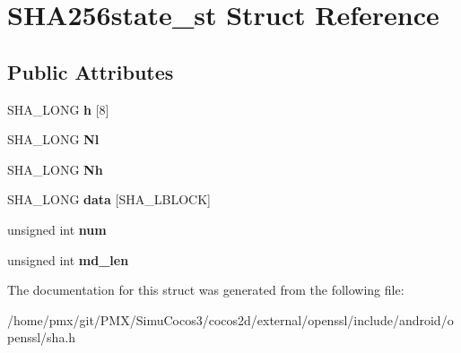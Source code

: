 \hypertarget{structSHA256state__st}{}\section{S\+H\+A256state\+\_\+st Struct Reference}
\label{structSHA256state__st}
\subsection*{Public Attributes}
\begin{DoxyCompactItemize}
\item 
\mbox{\label{structSHA256state__st_a3e23ec545b1c5f0a3cb246cfd1f24d03}} 
S\+H\+A\+\_\+\+L\+O\+NG {\bfseries h} \mbox{[}8\mbox{]}
\item 
\mbox{\label{structSHA256state__st_ac34962074aa1766470fae99d0e2aef9b}} 
S\+H\+A\+\_\+\+L\+O\+NG {\bfseries Nl}
\item 
\mbox{\label{structSHA256state__st_a02ad38687202dc1f21f78925599ec5ca}} 
S\+H\+A\+\_\+\+L\+O\+NG {\bfseries Nh}
\item 
\mbox{\label{structSHA256state__st_a23e96bd033fbbfbe1e8a016180d2215c}} 
S\+H\+A\+\_\+\+L\+O\+NG {\bfseries data} \mbox{[}S\+H\+A\+\_\+\+L\+B\+L\+O\+CK\mbox{]}
\item 
\mbox{\label{structSHA256state__st_a64f6a539f36e85e82781026b68c968cf}} 
unsigned int {\bfseries num}
\item 
\mbox{\label{structSHA256state__st_a8156b1d2d8afc2bd0f0875a943b9f36a}} 
unsigned int {\bfseries md\+\_\+len}
\end{DoxyCompactItemize}


The documentation for this struct was generated from the following file\+:\begin{DoxyCompactItemize}
\item 
/home/pmx/git/\+P\+M\+X/\+Simu\+Cocos3/cocos2d/external/openssl/include/android/openssl/sha.\+h\end{DoxyCompactItemize}
